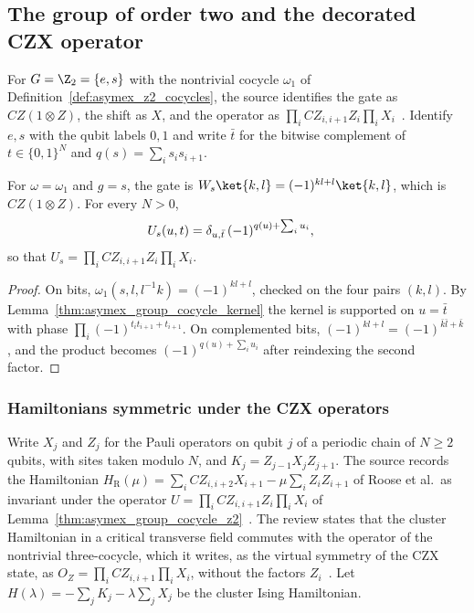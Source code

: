 \subsection{The group of order two and the decorated CZX operator}

For $G=\Z_2=\{e,s\}$ with the nontrivial cocycle $\omega_1$ of
Definition~\ref{def:asymex_z2_cocycles}, the source identifies the gate as
$CZ(1\otimes Z)$, the shift as $X$, and the operator as
$\prod_iCZ_{i,i+1}Z_i\prod_iX_i$~\cite{GarreRubio2023MPOSym}. Identify
$e,s$ with the qubit labels $0,1$ and write $\bar t$ for the bitwise
complement of $t\in\{0,1\}^N$ and $q(s)=\sum_is_is_{i+1}$.

\begin{lemma}
    \label{thm:asymex_group_cocycle_z2}
    \leanok
    For $\omega=\omega_1$ and $g=s$, the gate is
    $W_s\ket{k,l}=(-1)^{kl+l}\ket{k,l}$, which is $CZ(1\otimes Z)$. For
    every $N>0$,
    \begin{align}
        U_s(u,t) & =\delta_{u,\bar t}\,(-1)^{q(u)+\sum_iu_i},
        \notag
    \end{align}
    so that $U_s=\prod_iCZ_{i,i+1}Z_i\prod_iX_i$.
\end{lemma}

\begin{proof}
    \leanok
    On bits, $\omega_1(s,l,l^{-1}k)=(-1)^{kl+l}$, checked on the four
    pairs $(k,l)$. By Lemma~\ref{thm:asymex_group_cocycle_kernel} the
    kernel is supported on $u=\bar t$ with phase
    $\prod_i(-1)^{t_it_{i+1}+t_{i+1}}$. On complemented bits,
    $(-1)^{kl+l}=(-1)^{\bar k\bar l+\bar k}$, and the product becomes
    $(-1)^{q(u)+\sum_iu_i}$ after reindexing the second factor.
\end{proof}

\subsubsection{Hamiltonians symmetric under the CZX operators}

Write $X_j$ and $Z_j$ for the Pauli operators on qubit $j$ of a periodic
chain of $N\geq2$ qubits, with sites taken modulo $N$, and
$K_j=Z_{j-1}X_jZ_{j+1}$. The source records the Hamiltonian
$H_{\mathrm R}(\mu)=\sum_iCZ_{i,i+2}X_{i+1}-\mu\sum_iZ_iZ_{i+1}$ of Roose
et al.\ as invariant under the operator
$U=\prod_iCZ_{i,i+1}Z_i\prod_iX_i$ of
Lemma~\ref{thm:asymex_group_cocycle_z2}~\cite{GarreRubio2023MPOSym}. The
review states that the cluster Hamiltonian in a critical transverse field
commutes with the operator of the nontrivial three-cocycle, which it writes,
as the virtual symmetry of the CZX state, as
$O_Z=\prod_iCZ_{i,i+1}\prod_iX_i$, without the factors
$Z_i$~\cite{Cirac2021Matrix}. Let
$H(\lambda)=-\sum_jK_j-\lambda\sum_jX_j$ be the cluster Ising Hamiltonian.

